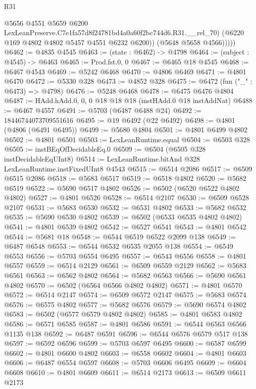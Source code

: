 \begin{lexlean}{R31}
\begin{coremodule}
                @5656
                @4551
                @5659
                @6200
                LexLeanPreserve.C7e1fa57d8f24781bd4a0a60f2bc744d6.R31.__rel_70)
              (@6220 @169 @4802 @4802 @5457 @4551 @6232 @6200))
            (@5648 @5658 @4566)))))
@6462 := @4835 @4545
@6463 := (state : @6462) -> @4798
@6464 := (subject : @4545) -> @6463
@6465 := Prod.fst.{0, 0}
@6467 := @6465 @18 @4545
@6468 := @6467 @4543
@6469 := @5242 @6468
@6470 := @4806 @6469
@6471 := @4801 @6470
@6472 := @5330 @328
@6473 := @4852 @328
@6475 := @6472 (fun ("_" : @6473) => @4798)
@6476 := @5248 @6468
@6478 := @6475 @6476 @4804
@6487 := HAdd.hAdd.{0, 0, 0} @18 @18 @18 (instHAdd.{0} @18 instAddNat)
@6488 := @6467 @4557
@6491 := @5703 (@6487 @6488 @24)
@6492 := 18446744073709551616
@6495 := @19 @6492 (@22 @6492)
@6498 := @4801 (@4806 (@6491 @6495))
@6499 := @5680 @4804
@6501 := @4801 @6499 @4802
@6502 := @4801 @6501
@6503 := LexLeanRuntime.equal
@6504 := @6503 @328
@6505 := instBEqOfDecidableEq.{0}
@6509 := @6504 (@6505 @328 instDecidableEqUInt8)
@6514 := LexLeanRuntime.bitAnd @328 LexLeanRuntime.instFixedUInt8 @4543
@6515 := @6514 @2086
@6517 := @6509 @6515 @2086
@6518 := @5683 @6517
@6519 := @6518 @4802
@6520 := @5682 @6519
@6522 := @5690 @6517 @4802
@6526 := @6502 (@6520 @6522 @4802 @4802)
@6527 := @4801 @6526
@6528 := @6514 @2107
@6530 := @6509 @6528 @2107
@6531 := @5683 @6530
@6532 := @6531 @4802
@6533 := @5682 @6532
@6535 := @5690 @6530 @4802
@6539 := @6502 (@6533 @6535 @4802 @4802)
@6541 := @4801 @6539 @4802
@6542 := @6527 @6541
@6543 := @4801 @6542
@6544 := @5681 @18
@6548 := @6544 @6519 @6522 @2099 @138
@6549 := @6487 @6548
@6553 := @6544 @6532 @6535 @2055 @138
@6554 := @6549 @6553
@6556 := @5703 @6554 @6495
@6557 := @6543 @6556
@6558 := @4801 @6557
@6559 := @6514 @2129
@6561 := @6509 @6559 @2129
@6562 := @5683 @6561
@6563 := @6562 @4802
@6564 := @5682 @6563
@6566 := @5690 @6561 @4802
@6570 := @6502 (@6564 @6566 @4802 @4802)
@6571 := @4801 @6570
@6572 := @6514 @2147
@6574 := @6509 @6572 @2147
@6575 := @5683 @6574
@6576 := @6575 @4802
@6577 := @5682 @6576
@6579 := @5690 @6574 @4802
@6583 := @6502 (@6577 @6579 @4802 @4802)
@6585 := @4801 @6583 @4802
@6586 := @6571 @6585
@6587 := @4801 @6586
@6591 := @6544 @6563 @6566 @1135 @138
@6592 := @6487 @6591
@6596 := @6544 @6576 @6579 @517 @138
@6597 := @6592 @6596
@6599 := @5703 @6597 @6495
@6600 := @6587 @6599
@6602 := @4801 @6600 @4802
@6603 := @6558 @6602
@6604 := @4801 @6603
@6606 := @6487 @6554 @6597
@6608 := @5703 @6606 @6495
@6609 := @6604 @6608
@6610 := @4801 @6609
@6611 := @6514 @2173
@6613 := @6509 @6611 @2173

\end{coremodule}
\end{lexlean}
